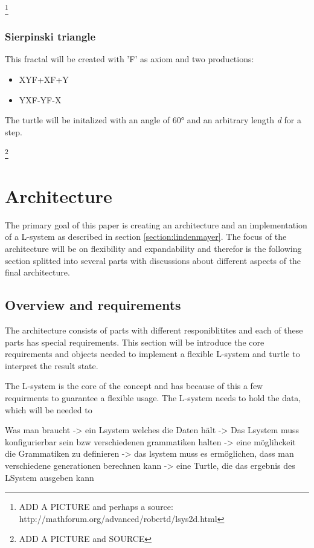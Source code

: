 \documentclass[english]{cpp-hmwk}
\begin{document}
\footnote{ADD A PICTURE and perhaps a source: http://mathforum.org/advanced/robertd/lsys2d.html}

\subsubsection{Sierpinski triangle}
This fractal will be created with 'F' as axiom and two productions:

\begin{itemize}
\item X\rightarrow YF+XF+Y
\item Y\rightarrow XF-YF-X
\end{itemize}

\noindent The turtle will be initalized with an angle of 60° and an arbitrary length \textit{d} for a step.
 
\footnote{ADD A PICTURE and SOURCE}


\pagebreak
\section{Architecture}
The primary goal of this paper is creating an architecture and an implementation of a L-system as described in section \ref{section:lindenmayer}. The focus of the architecture will be on flexibility and expandability and therefor is the following section splitted into several parts with discussions about different aspects of the final architecture.

\subsection{Overview and requirements}
The architecture consists of parts with different responiblitites and each of these parts has special requirements. This section will be introduce the core requirements and objects needed to implement a flexible L-system and turtle to interpret the result state.

\medskip
\noindent The L-system is the core of the concept and has because of this a few requirments to guarantee a flexible usage. The L-system needs to hold the data, which will be needed to 



Was man braucht
-> ein Lsystem welches die Daten hält 
-> Das Lsystem muss konfigurierbar sein bzw verschiedenen grammatiken halten
-> eine möglihckeit die Grammatiken zu definieren
-> das lsystem muss es ermöglichen, dass man verschiedene generationen berechnen kann
-> eine Turtle, die das ergebnis des LSystem ausgeben kann
\end{document}
